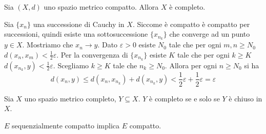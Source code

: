\documentclass[a4paper]{article}
\begin{document}
\begin{snippettheorem}{}
    Sia \((X, d)\) uno spazio metrico compatto.
    Allora \(X\) è completo.
\end{snippettheorem}

\begin{snippetproof}{}
    Sia \(\{x_n\}\) una successione di Cauchy in \(X\).
    Siccome è compatto è compatto per successioni, quindi esiste una sottosuccessione
    \(\{x_{n_k}\}\) che converge ad un punto \(y \in X\).
    Mostriamo che \(x_n \to y\).
    Dato \(\varepsilon > 0\) esiste \(N_0\) tale che per ogni \(m,n \geq N_0\)
    \(d(x_n, x_m) < \frac{1}{2}\varepsilon\).
    Per la convergenza di \(\{x_{n_k}\}\) esiste \(K\) tale che per ogni \(k \geq K\)
    \(d(x_{n_k}, y) < \frac{1}{2}\varepsilon\).
    Scegliamo \(k\geq K\) tale che \(n_k\geq N_0\).
    Allora per ogni \(n \geq N_0\) si ha
    \[
        d(x_n, y) \leq d(x_n, x_{n_k}) + d(x_{n_k}, y) < \frac{1}{2}\varepsilon + \frac{1}{2}\varepsilon = \varepsilon
    \]
\end{snippetproof}



Sia \(X\) uno spazio metrico completo, \(Y \subseteq X\).
\(Y\) è completo se e solo se \(Y\) è chiuso in \(X\).

\begin{snippettheorem}{}
    \(E\) sequenzialmente compatto implica \(E\) compatto.
\end{snippettheorem}
\end{document}
